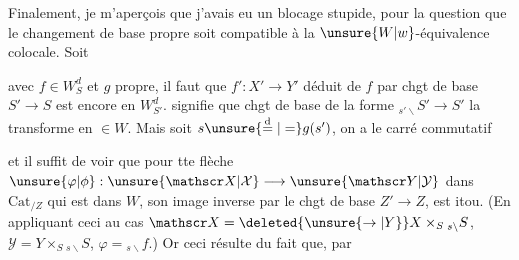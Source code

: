

Finalement, je m'aperçois que j'avais eu un blocage stupide, pour la question que le changement de base propre soit compatible à la $\unsure{W|w}$-équivalence colocale. Soit


avec $f\in W_S^d$ et $g$ propre, il faut  que $f':X'\longrightarrow Y'$ déduit de $f$ par chgt de base $S'\longrightarrow S$ est encore en $W_{S'}^d$.  signifie que  chgt de base de la forme $ {}_{s'\backslash}S'\longrightarrow S'$ la transforme en  $\in W$. Mais soit $s\unsure{\overset{\mathrm d}{=}|=}g(s')$, on a le carré commutatif


 et il suffit de voir que pour tte flèche $\unsure{\varphi|\phi}:\unsure{\mathscr X|\mathcal X}\longrightarrow\unsure{\mathscr Y|\mathcal Y}$ dans $\mathrm{Cat}_{/Z}$ qui est dans $W$, son image inverse par le chgt de base $Z'\longrightarrow Z$, est itou. (En appliquant ceci au cas $\mathscr X=\deleted{\unsure{\rightarrow|Y}}X\times_S{}_{s\backslash}S$, $\mathscr Y=Y\times_S{}_{s\backslash}S$, $\varphi={}_{s\backslash}f$.) Or ceci résulte du fait que, par

